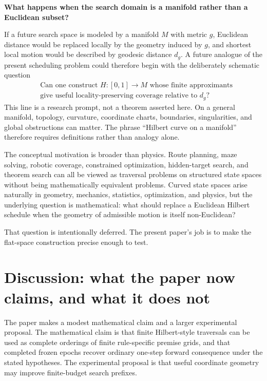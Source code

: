 \documentclass[11pt]{article}
\theoremstyle{hilberttheorem}
\begin{document}
\begin{tcolorbox}[colback=SoftBlue,colframe=HilbertBlue!70,arc=2mm,boxrule=.6pt,title={Leading question}]
\centering\Large\bfseries What happens when the search domain is a manifold rather than a Euclidean subset?
\end{tcolorbox}

If a future search space is modeled by a manifold $M$ with metric $g$, Euclidean distance would be replaced locally by the geometry induced by $g$, and shortest local motion would be described by geodesic distance $d_g$. A future analogue of the present scheduling problem could therefore begin with the deliberately schematic question
\[
\begin{aligned}
&\text{Can one construct } H:[0,1]\to M \text{ whose finite approximants}\\
&\text{give useful locality-preserving coverage relative to } d_g\text{?}
\end{aligned}
\]
This line is a research prompt, not a theorem asserted here. On a general manifold, topology, curvature, coordinate charts, boundaries, singularities, and global obstructions can matter. The phrase ``Hilbert curve on a manifold'' therefore requires definitions rather than analogy alone.

The conceptual motivation is broader than physics. Route planning, maze solving, robotic coverage, constrained optimization, hidden-target search, and theorem search can all be viewed as traversal problems on structured state spaces without being mathematically equivalent problems. Curved state spaces arise naturally in geometry, mechanics, statistics, optimization, and physics, but the underlying question is mathematical: what should replace a Euclidean Hilbert schedule when the geometry of admissible motion is itself non-Euclidean?

That question is intentionally deferred. The present paper's job is to make the flat-space construction precise enough to test.

\section{Discussion: what the paper now claims, and what it does not}\label{sec:discussion}
The paper makes a modest mathematical claim and a larger experimental proposal. The mathematical claim is that finite Hilbert-style traversals can be used as complete orderings of finite rule-specific premise grids, and that completed frozen epochs recover ordinary one-step forward consequence under the stated hypotheses. The experimental proposal is that useful coordinate geometry may improve finite-budget search prefixes.
\end{document}
